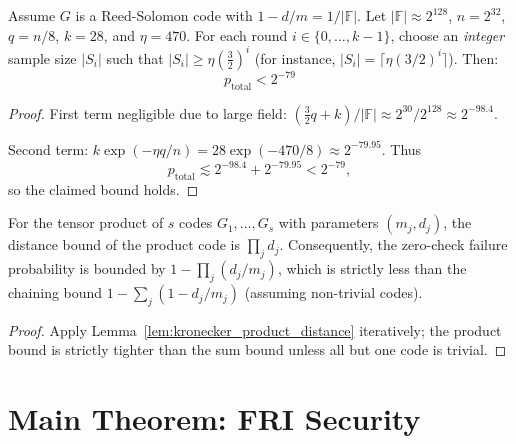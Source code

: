 \begin{lemma}\label{lem:concrete_parameters}  \leanok
{}
Assume $G$ is a Reed-Solomon code with $1 - d/m = 1/|\mathbb{F}|$.
Let $|\mathbb{F}| \approx 2^{128}$, $n = 2^{32}$, $q = n/8$, $k=28$, and $\eta = 470$.
For each round $i \in \{0,\dots,k-1\}$, choose an \emph{integer} sample size $|S_i|$
such that $|S_i| \ge \eta \left(\frac{3}{2}\right)^i$ (for instance,
$|S_i| = \lceil \eta (3/2)^i \rceil$).
Then:
\[ p_{\text{total}} < 2^{-79} \]
\end{lemma}
\begin{proof} \leanok
First term negligible due to large field: $(\frac{3}{2}q + k)/|\mathbb{F}| \approx 2^{30}/2^{128} \approx 2^{-98.4}$.

Second term: $k \exp(-\eta q/n) = 28 \exp(-470/8) \approx 2^{-79.95}$. Thus
\[
  p_{\text{total}} \lesssim 2^{-98.4} + 2^{-79.95} < 2^{-79},
\]
so the claimed bound holds.
\end{proof}

\begin{lemma}\label{lem:kronecker_generalization}  \leanok
{}
For the tensor product of $s$ codes $G_1,\ldots,G_s$ with parameters $(m_j, d_j)$, the distance bound of the product code is $\prod_j d_j$.
Consequently, the zero-check failure probability is bounded by $1 - \prod_j (d_j/m_j)$, which is strictly less than the chaining bound $1 - \sum_j (1 - d_j/m_j)$ (assuming non-trivial codes).
\end{lemma}
\begin{proof} \leanok
Apply Lemma~\ref{lem:kronecker_product_distance} iteratively; the product bound is strictly tighter than the sum bound unless all but one code is trivial.
\end{proof}

\section*{Main Theorem: FRI Security}


